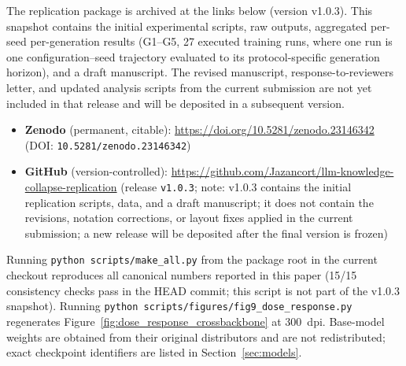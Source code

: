 \documentclass[a4paper,fleqn]{cas-dc}
\newif\ifshowchanges
\newcommand{\rev}[1]{\ifshowchanges{\color{blue}#1}\else{#1}\fi}
\begin{document}
\rev{The replication package is archived at the links below (version v1.0.3). This snapshot contains the initial experimental scripts, raw outputs, aggregated per-seed per-generation results (G1--G5, 27 executed training runs, where one run is one configuration--seed trajectory evaluated to its protocol-specific generation horizon), and a draft manuscript. The revised manuscript, response-to-reviewers letter, and updated analysis scripts from the current submission are not yet included in that release and will be deposited in a subsequent version.}


\begin{itemize}
  \item \textbf{Zenodo} (permanent, citable):
    \url{https://doi.org/10.5281/zenodo.23146342}
    (DOI: \texttt{10.5281/zenodo.23146342})
  \item \textbf{GitHub} (version-controlled):
    \url{https://github.com/Jazancort/llm-knowledge-collapse-replication}
    (release \texttt{v1.0.3}; \rev{note: v1.0.3 contains the initial replication scripts, data, and a draft manuscript; it does not contain the revisions, notation corrections, or layout fixes applied in the current submission; a new release will be deposited after the final version is frozen})
\end{itemize}

\rev{Running \texttt{python scripts/make\_all.py} from the package root in the current checkout reproduces all canonical numbers reported in this paper (15/15 consistency checks pass in the HEAD commit; this script is not part of the v1.0.3 snapshot).}
Running \texttt{python scripts/figures/fig9\_dose\_response.py} regenerates
Figure~\ref{fig:dose_response_crossbackbone} at 300~dpi.
Base-model weights are obtained from their original distributors and are not
redistributed; exact checkpoint identifiers are listed in
Section~\ref{sec:models}.



\end{document}
